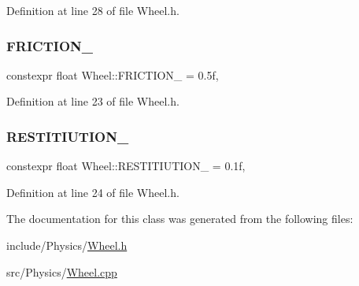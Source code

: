 Definition at line 28 of file Wheel.\+h.

\mbox{\label{classWheel_a714e23dd922b96909529cc611e515603}} 
\subsubsection{\texorpdfstring{F\+R\+I\+C\+T\+I\+O\+N\+\_\+}{FRICTION\_}}
{\footnotesize\ttfamily constexpr float Wheel\+::\+F\+R\+I\+C\+T\+I\+O\+N\+\_\+ = 0.\+5f\hspace{0.3cm}{\ttfamily [static]}, {\ttfamily [private]}}



Definition at line 23 of file Wheel.\+h.

\mbox{\label{classWheel_ad8d457ae4fcae73501f37a35f044d024}} 
\subsubsection{\texorpdfstring{R\+E\+S\+T\+I\+T\+I\+U\+T\+I\+O\+N\+\_\+}{RESTITIUTION\_}}
{\footnotesize\ttfamily constexpr float Wheel\+::\+R\+E\+S\+T\+I\+T\+I\+U\+T\+I\+O\+N\+\_\+ = 0.\+1f\hspace{0.3cm}{\ttfamily [static]}, {\ttfamily [private]}}



Definition at line 24 of file Wheel.\+h.



The documentation for this class was generated from the following files\+:\begin{DoxyCompactItemize}
\item 
include/\+Physics/\hyperlink{Wheel_8h}{Wheel.\+h}\item 
src/\+Physics/\hyperlink{Wheel_8cpp}{Wheel.\+cpp}\end{DoxyCompactItemize}
